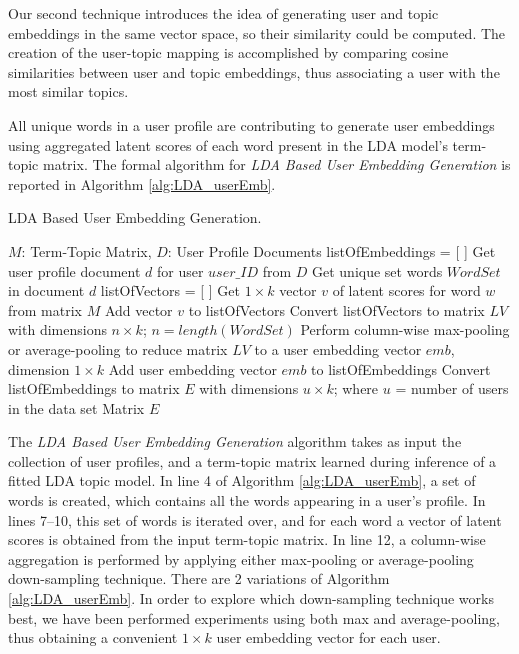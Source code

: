             Our second technique introduces the idea of generating user and topic embeddings in the same vector space, so their similarity could be computed. The creation of the user-topic mapping is accomplished by comparing cosine similarities between user and topic embeddings, thus associating a user with the most similar topics. 
            
            All unique words in a user profile are contributing to generate user embeddings using aggregated latent scores of each word present in the LDA model's term-topic matrix. The formal algorithm for \emph{LDA Based User Embedding Generation} is reported in Algorithm \ref{alg:LDA_userEmb}. 
            
            \begin{algorithm}
                \caption{LDA Based User Embedding Generation.}
                \label{alg:LDA_userEmb}
                \begin{algorithmic}[1]
                    \REQUIRE $M$: Term-Topic Matrix, $D$: User Profile Documents 
                    \STATE listOfEmbeddings = [ ]
                        \STATE Get user profile document $d$ for user $user\_ID$ from $D$
                        \STATE Get unique set words $WordSet$ in document $d$
                        \STATE listOfVectors = [ ]
                        \STATE
                            \STATE Get $1 \times k$ vector $v$ of latent scores for word $w$ from matrix $M$
                            \STATE Add vector $v$ to listOfVectors
                        \ENDFOR
                        \STATE Convert listOfVectors to matrix $LV$ with dimensions $n \times k$; $n=length(WordSet)$
                        \STATE Perform column-wise max-pooling or average-pooling to reduce matrix $LV$ to a user embedding vector $emb$, dimension $1 \times k$
                        \STATE Add user embedding vector $emb$ to listOfEmbeddings
                    \ENDFOR
                    \STATE Convert listOfEmbeddings to matrix $E$ with dimensions $u \times k$; where $u$ = number of users in the data set
                    \RETURN Matrix $E$
                \end{algorithmic}
            \end{algorithm}
        
            The \emph{LDA Based User Embedding Generation} algorithm takes as input the collection of user profiles, and a term-topic matrix learned during inference of a fitted LDA topic model. In line 4 of Algorithm \ref{alg:LDA_userEmb}, a set of words is created, which contains all the words appearing in a user's profile. In lines 7--10, this set of words is iterated over, and for each word a vector of latent scores is obtained from the input term-topic matrix. In line 12, a column-wise aggregation is performed by applying either max-pooling or average-pooling down-sampling technique. There are 2 variations of Algorithm \ref{alg:LDA_userEmb}. In order to explore which down-sampling technique works best, we have been performed experiments using both max and average-pooling, thus obtaining a convenient $1 \times k$ user embedding vector for each user.
            
